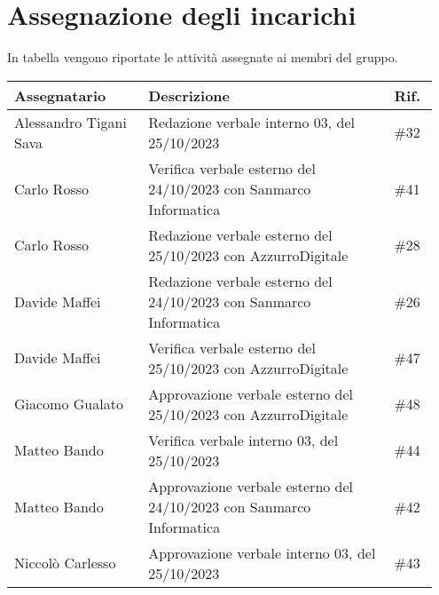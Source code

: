 \section{Assegnazione degli incarichi}
In tabella vengono riportate le attività assegnate ai membri del gruppo.
\begin{center}
    {
    \renewcommand{\arraystretch}{1.5}
    \begin{tabular}{p{0.30\linewidth}|p{0.55\linewidth}|p{0.10\linewidth}}
		\textbf{Assegnatario}   &   \textbf{Descrizione}   & \textbf{Rif.}     \\
		\hline
		Alessandro Tigani Sava  & Redazione verbale interno 03, del 25/10/2023 							& \#32 	\\
		\hline
		Carlo Rosso				& Verifica verbale esterno del 24/10/2023 con Sanmarco Informatica      & \#41 	\\
		\hline
		Carlo Rosso				& Redazione verbale esterno del 25/10/2023 con AzzurroDigitale	        & \#28 	\\
		\hline
		Davide Maffei			& Redazione verbale esterno del 24/10/2023 con Sanmarco Informatica	    & \#26 	\\
		\hline
		Davide Maffei			& Verifica verbale esterno del 25/10/2023 con AzzurroDigitale           & \#47 	\\
		\hline
		Giacomo Gualato			& Approvazione verbale esterno del 25/10/2023 con AzzurroDigitale	    & \#48 	\\
		\hline
		Matteo Bando			& Verifica verbale interno 03, del 25/10/2023		& \#44 	\\
		\hline
		Matteo Bando			& Approvazione verbale esterno del 24/10/2023 con Sanmarco Informatica	& \#42 	\\
		\hline
		Niccolò Carlesso		& Approvazione verbale interno 03, del 25/10/2023 	& \#43 	\\
    \end{tabular}
    }
\end{center}